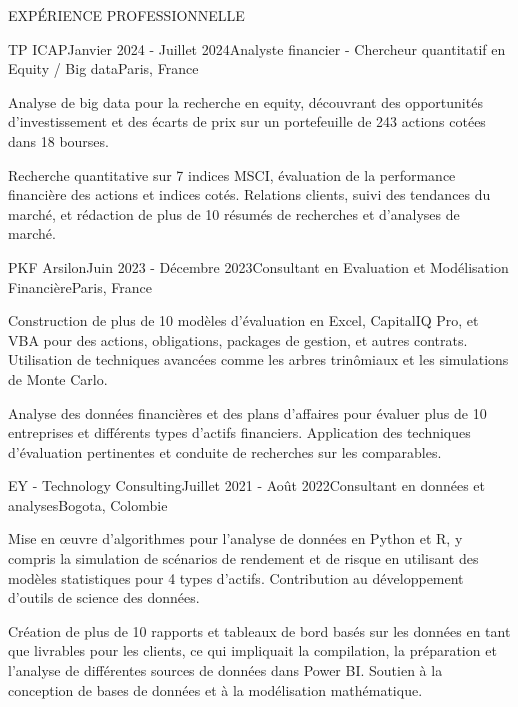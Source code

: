 \documentclass{resume} %
\begin{document}
\begin{rSection}{EXPÉRIENCE PROFESSIONNELLE}

    \begin{rSubsection}{TP ICAP}{Janvier 2024 - Juillet 2024}{Analyste financier - Chercheur quantitatif en Equity / Big data}{Paris, France}
        \item Analyse de big data pour la recherche en equity, découvrant des opportunités d'investissement et des écarts de prix sur un portefeuille de 243 actions cotées dans 18 bourses.
        \item Recherche quantitative sur 7 indices MSCI, évaluation de la performance financière des actions et indices cotés. Relations clients, suivi des tendances du marché, et rédaction de plus de 10 résumés de recherches et d'analyses de marché.
    \end{rSubsection}
    
    \begin{rSubsection}{PKF Arsilon}{Juin 2023 - Décembre 2023}{Consultant en Evaluation et Modélisation Financière}{Paris, France}
        \item Construction de plus de 10 modèles d'évaluation en Excel, CapitalIQ Pro, et VBA pour des actions, obligations, packages de gestion, et autres contrats. Utilisation de techniques avancées comme les arbres trinômiaux et les simulations de Monte Carlo.
        \item Analyse des données financières et des plans d'affaires pour évaluer plus de 10 entreprises et différents types d'actifs financiers. Application des techniques d'évaluation pertinentes et conduite de recherches sur les comparables.
    \end{rSubsection}
    
    \begin{rSubsection}{EY - Technology Consulting}{Juillet 2021 - Août 2022}{Consultant en données et analyses}{Bogota, Colombie}
        \item Mise en œuvre d'algorithmes pour l'analyse de données en Python et R, y compris la simulation de scénarios de rendement et de risque en utilisant des modèles statistiques pour 4 types d'actifs. Contribution au développement d'outils de science des données.
        \item Création de plus de 10 rapports et tableaux de bord basés sur les données en tant que livrables pour les clients, ce qui impliquait la compilation, la préparation et l'analyse de différentes sources de données dans Power BI. Soutien à la conception de bases de données et à la modélisation mathématique.
    \end{rSubsection}
    \end{rSection}
\end{document}
